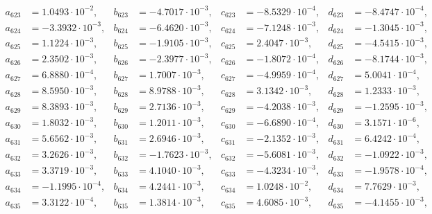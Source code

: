 \begin{align*}
  a_{ 623 } &= 1.0493 \cdot 10^{ -2 }, & b_{ 623 } &= -4.7017 \cdot 10^{ -3 }, & c_{ 623 } &= -8.5329 \cdot 10^{ -4 }, & d_{ 623 } &= -8.4747 \cdot 10^{ -4 }, \\ 
  a_{ 624 } &= -3.3932 \cdot 10^{ -3 }, & b_{ 624 } &= -6.4620 \cdot 10^{ -3 }, & c_{ 624 } &= -7.1248 \cdot 10^{ -3 }, & d_{ 624 } &= -1.3045 \cdot 10^{ -3 }, \\ 
  a_{ 625 } &= 1.1224 \cdot 10^{ -3 }, & b_{ 625 } &= -1.9105 \cdot 10^{ -3 }, & c_{ 625 } &= 2.4047 \cdot 10^{ -3 }, & d_{ 625 } &= -4.5415 \cdot 10^{ -3 }, \\ 
  a_{ 626 } &= 2.3502 \cdot 10^{ -3 }, & b_{ 626 } &= -2.3977 \cdot 10^{ -3 }, & c_{ 626 } &= -1.8072 \cdot 10^{ -4 }, & d_{ 626 } &= -8.1744 \cdot 10^{ -3 }, \\ 
  a_{ 627 } &= 6.8880 \cdot 10^{ -4 }, & b_{ 627 } &= 1.7007 \cdot 10^{ -3 }, & c_{ 627 } &= -4.9959 \cdot 10^{ -4 }, & d_{ 627 } &= 5.0041 \cdot 10^{ -4 }, \\ 
  a_{ 628 } &= 8.5950 \cdot 10^{ -3 }, & b_{ 628 } &= 8.9788 \cdot 10^{ -3 }, & c_{ 628 } &= 3.1342 \cdot 10^{ -3 }, & d_{ 628 } &= 1.2333 \cdot 10^{ -3 }, \\ 
  a_{ 629 } &= 8.3893 \cdot 10^{ -3 }, & b_{ 629 } &= 2.7136 \cdot 10^{ -3 }, & c_{ 629 } &= -4.2038 \cdot 10^{ -3 }, & d_{ 629 } &= -1.2595 \cdot 10^{ -3 }, \\ 
  a_{ 630 } &= 1.8032 \cdot 10^{ -3 }, & b_{ 630 } &= 1.2011 \cdot 10^{ -3 }, & c_{ 630 } &= -6.6890 \cdot 10^{ -4 }, & d_{ 630 } &= 3.1571 \cdot 10^{ -6 }, \\ 
  a_{ 631 } &= 5.6562 \cdot 10^{ -3 }, & b_{ 631 } &= 2.6946 \cdot 10^{ -3 }, & c_{ 631 } &= -2.1352 \cdot 10^{ -3 }, & d_{ 631 } &= 6.4242 \cdot 10^{ -4 }, \\ 
  a_{ 632 } &= 3.2626 \cdot 10^{ -3 }, & b_{ 632 } &= -1.7623 \cdot 10^{ -3 }, & c_{ 632 } &= -5.6081 \cdot 10^{ -3 }, & d_{ 632 } &= -1.0922 \cdot 10^{ -3 }, \\ 
  a_{ 633 } &= 3.3719 \cdot 10^{ -3 }, & b_{ 633 } &= 4.1040 \cdot 10^{ -3 }, & c_{ 633 } &= -4.3234 \cdot 10^{ -3 }, & d_{ 633 } &= -1.9578 \cdot 10^{ -4 }, \\ 
  a_{ 634 } &= -1.1995 \cdot 10^{ -4 }, & b_{ 634 } &= 4.2441 \cdot 10^{ -3 }, & c_{ 634 } &= 1.0248 \cdot 10^{ -2 }, & d_{ 634 } &= 7.7629 \cdot 10^{ -3 }, \\ 
  a_{ 635 } &= 3.3122 \cdot 10^{ -4 }, & b_{ 635 } &= 1.3814 \cdot 10^{ -3 }, & c_{ 635 } &= 4.6085 \cdot 10^{ -3 }, & d_{ 635 } &= -4.1455 \cdot 10^{ -3 }, \\ 

\end{align*}
